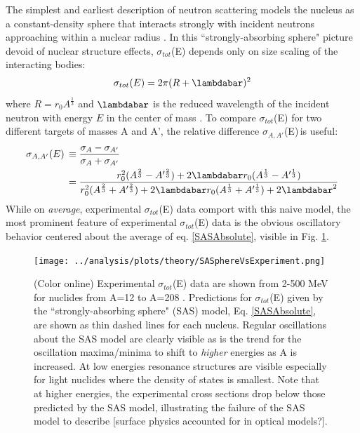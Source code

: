 \documentclass[twocolumn,secnumarabic,amssymb, nobibnotes, aps, prl,
superscriptaddress, nobalancelastpage]{revtex4}
\newcommand{\totEs}{\ensuremath{\sigma_{tot}}(E)\,\,}
\newcommand{\totRDs}{\ensuremath{\sigma_{A,A'}}(E)\,}
\begin{document}
The simplest and earliest description of neutron scattering models the nucleus as a constant-density sphere that interacts
strongly with incident neutrons approaching within a nuclear radius
\cite{Feshbach1949}. In this ``strongly-absorbing sphere"
picture devoid of nuclear structure effects, \totEs depends
only on size scaling of the interacting bodies:
\begin{equation} \label{SASAbsolute}
    \sigma_{tot}(E) = 2\pi(R + \lambdabar)^{2}
\end{equation}
where $R=r_{0}A^{\frac{1}{3}}$ and $\lambdabar$ is the reduced wavelength
of the incident neutron with energy $E$ in the center of mass \cite{Fernbach1949, Satchler1980}. 
To compare \totEs for two different targets of masses A and A', the relative
difference \totRDs is useful:
\begin{equation} \label{SASRelDiff}
    \begin{split}
        \totRDs & \equiv
    \frac{\sigma_{A}-\sigma_{A'}}{\sigma_{A}+\sigma_{A'}} \\
    & =
    \frac{r_{0}^{2}(A^{\frac{2}{3}}-A'^{\frac{2}{3}}) +
    2\lambdabar r_{0}(A^{\frac{1}{3}}-A'^{\frac{1}{3}})}
    {r_{0}^{2}(A^{\frac{2}{3}}+A'^{\frac{2}{3}}) +
    2\lambdabar r_{0}(A^{\frac{1}{3}}+A'^{\frac{1}{3}}) + 2\lambdabar^{2}}
    \end{split}
\end{equation}
While on \textit{average}, experimental \totEs data comport with this naive
model, the most prominent feature of experimental \totEs data is the obvious oscillatory
behavior centered about the average of eq. \ref{SASAbsolute}, visible in Fig.
\ref{SASphereVsExperiment}.

\begin{figure}
    \texttt{[image: ../analysis/plots/theory/SASphereVsExperiment.png]}
    \caption{(Color online) Experimental \totEs data are shown from 2-500
        MeV for nuclides from A=12 to A=208
        \cite{Finlay1993, Schwartz1974, Poenitz1983, Abfalterer2000, Abfalterer2001}.
        Predictions for \totEs given by the ``strongly-absorbing sphere" (SAS)
        model, Eq. \ref{SASAbsolute}, are shown as thin dashed lines for each nucleus.
        Regular oscillations about the SAS model are clearly visible
        as is the trend for the oscillation
        maxima/minima to shift to \textit{higher} energies as A is increased. At low energies 
        resonance structures are visible especially for light nuclides where the
        density of states is smallest. Note that at higher energies, the experimental
        cross sections drop below those predicted by the SAS model, illustrating
    the failure of the SAS model to describe [surface physics accounted for in
optical models?].}
    \label{SASphereVsExperiment}
\end{figure}
\end{document}

